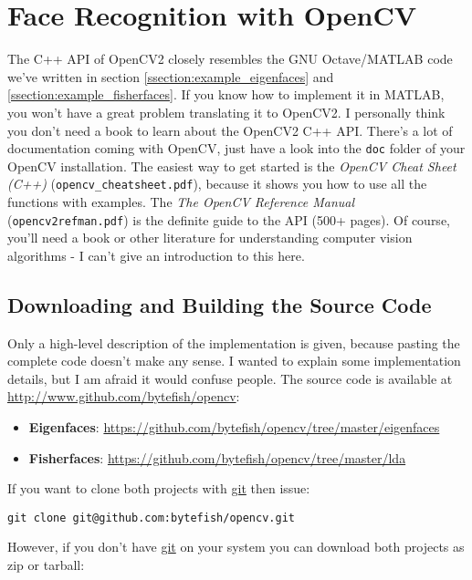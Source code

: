 \section{Face Recognition with OpenCV}
The C++ API of OpenCV2 closely resembles the GNU Octave/MATLAB code we've written in section \ref{ssection:example_eigenfaces} and \ref{ssection:example_fisherfaces}. If you know how to implement it in MATLAB, you won't have a great problem translating it to OpenCV2. I personally think you don't need a book to learn about the OpenCV2 C++ API. There's a lot of documentation coming with OpenCV, just have a look into the \lstinline|doc| folder of your OpenCV installation. The easiest way to get started is the \textit{OpenCV Cheat Sheet (C++)} (\lstinline|opencv_cheatsheet.pdf|), because it shows you how to use all the functions with examples. The \textit{The OpenCV Reference Manual} (\lstinline|opencv2refman.pdf|) is the definite guide to the API (500+ pages). Of course, you'll need a book or other literature for understanding computer vision algorithms - I can't give an introduction to this here.

\subsection{Downloading and Building the Source Code}

Only a high-level description of the implementation is given, because pasting the complete code doesn't make any sense. I wanted to explain some implementation details, but I am afraid it would confuse people. The source code is available at \url{http://www.github.com/bytefish/opencv}:

\begin{itemize}
	\item \textbf{Eigenfaces}: \url{https://github.com/bytefish/opencv/tree/master/eigenfaces}
	\item \textbf{Fisherfaces}: \url{https://github.com/bytefish/opencv/tree/master/lda}
\end{itemize}

If you want to clone both projects with \href{http://git-scm.com/}{git} then issue:

\begin{lstlisting}
git clone git@github.com:bytefish/opencv.git
\end{lstlisting}

However, if you don't have \href{http://git-scm.com/}{git} on your system you can download both projects as zip or tarball:


